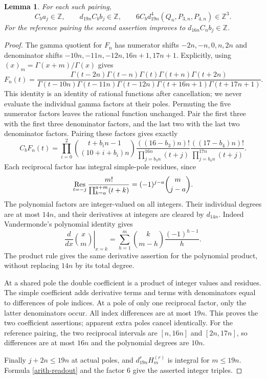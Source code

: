 \documentclass[11pt]{article}
\newcommand{\Z}{\mathbb Z}
\newtheorem{lemma}{Lemma}
\begin{document}
\begin{lemma}\label{arith-integral}
For each such pairing,
\[
 C_ba_j\in\Z,\qquad d_{19n}C_bb_j\in\Z,
 \qquad6C_bd_{19n}^4(Q_n,P_{3,n},P_{4,n})\in\Z^3.
\]
For the reference pairing the second assertion improves to
$d_{16n}C_nb_j\in\Z$.
\end{lemma}
\begin{proof}
The gamma quotient for $F_n$ has numerator shifts $-2n,-n,0,n,2n$
and denominator shifts $-10n,-11n,-12n,16n+1,17n+1$.
Explicitly, using $(x)_m=\Gamma(x+m)/\Gamma(x)$ gives
\[
 F_n(t)=\frac{\Gamma(t-2n)\Gamma(t-n)\Gamma(t)
                    \Gamma(t+n)\Gamma(t+2n)}
 {\Gamma(t-10n)\Gamma(t-11n)\Gamma(t-12n)
                    \Gamma(t+16n+1)\Gamma(t+17n+1)}.
\]
This identity is an identity of rational functions after cancellation;
we never evaluate the individual gamma factors at their poles.
Permuting the five numerator factors leaves the rational function
unchanged. Pair the first three with the first three denominator factors,
and the last two with the last two denominator factors.
Pairing these factors gives exactly
\[
 C_bF_n(t)=
 \prod_{i=0}^2\binom{t+b_in-1}{(10+i+b_i)n}
 \frac{((16-b_3)n)!}{\prod_{j=b_3n}^{16n}(t+j)}
 \frac{((17-b_4)n)!}{\prod_{j=b_4n}^{17n}(t+j)}.
\]
Each reciprocal factor has integral simple-pole residues, since
\[
 \mathop{\rm Res}_{t=-j}
 \frac{m!}{\prod_{k=a}^{a+m}(t+k)}
 =(-1)^{j-a}\binom m{j-a}.
\]
The polynomial factors are integer-valued on all integers. Their
individual degrees are at most $14n$, and their derivatives at integers
are cleared by $d_{14n}$. Indeed Vandermonde's polynomial identity gives
\[
 \left.\frac{d}{dx}\binom{x}{m}\right|_{x=k}
 =\sum_{h=1}^m\binom{k}{m-h}\frac{(-1)^{h-1}}h.
\]
The product rule gives the same derivative assertion for the polynomial
product, without replacing $14n$ by its total degree.

At a shared pole the double coefficient is a product of integer values
and residues. The simple coefficient adds derivative terms and terms
with denominators equal to differences of pole indices. At a pole of
only one reciprocal factor, only the latter denominators occur. All
index differences are at most $19n$. This proves the two coefficient
assertions; apparent extra poles cancel identically.
For the reference pairing, the two reciprocal intervals are
$[n,16n]$ and $[2n,17n]$, so differences are at most $16n$ and the
polynomial degrees are $10n$.

Finally $j+2n\leq19n$ at actual poles, and $d_{19n}^rH_m^{(r)}$ is
integral for $m\leq19n$. Formula \eqref{arith-readout} and the factor $6$
give the asserted integer triples.
\end{proof}
\end{document}

